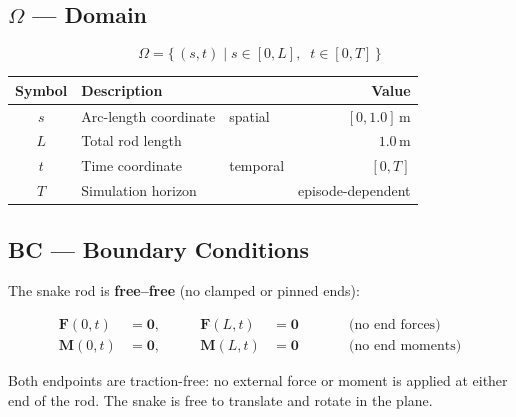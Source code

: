 \documentclass[11pt]{article}
\newcommand{\vect}[1]{\mathbf{#1}}
\begin{document}
\subsection{\texorpdfstring{$\Omega$}{Omega} --- Domain}
\label{sec:Omega}

\begin{equation}
  \Omega = \bigl\{\,(s, t) \;\big|\; s \in [0, L],\;\; t \in [0, T]\,\bigr\}
  \label{eq:domain}
\end{equation}

\begin{table}[H]
  \centering
  \begin{tabular}{cllr}
    \toprule
    Symbol & Description & & Value \\
    \midrule
    $s$ & Arc-length coordinate & spatial & $[0, 1.0]$\,m \\
    $L$ & Total rod length & & $1.0$\,m \\
    $t$ & Time coordinate & temporal & $[0, T]$ \\
    $T$ & Simulation horizon & & episode-dependent \\
    \bottomrule
  \end{tabular}
\end{table}

\subsection{BC --- Boundary Conditions}
\label{sec:BC}

The snake rod is \textbf{free--free} (no clamped or pinned ends):

\begin{subequations}
\label{eq:bc}
\begin{alignat}{3}
  \vect{F}(0, t) &= \vect{0}, &\qquad \vect{F}(L, t) &= \vect{0}
    &\qquad& \text{(no end forces)}
  \label{eq:bc-force} \\[4pt]
  \vect{M}(0, t) &= \vect{0}, &\qquad \vect{M}(L, t) &= \vect{0}
    &\qquad& \text{(no end moments)}
  \label{eq:bc-moment}
\end{alignat}
\end{subequations}

\noindent
Both endpoints are traction-free: no external force or moment is applied at either end of the rod.
The snake is free to translate and rotate in the plane.
\end{document}

